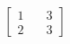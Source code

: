\documentclass[preview]{standalone}
\begin{document}
\begin{align*}
\begin{bmatrix} 1 & \quad 3 \\ 2 & \quad 3 \end{bmatrix}
\end{align*}
\end{document}
